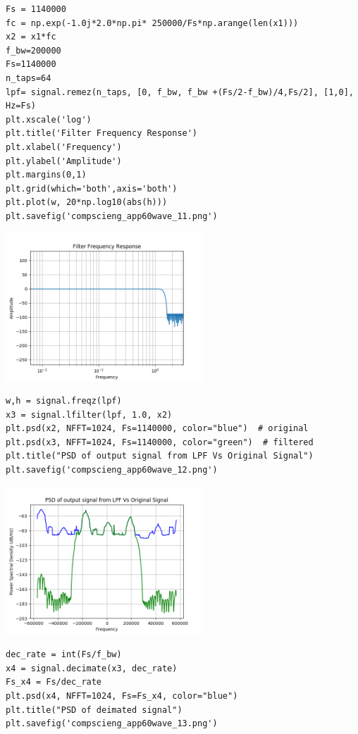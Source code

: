 \documentclass[12pt,fleqn]{article}\usepackage{../../common}
\begin{document}
\begin{verbatim}
Fs = 1140000
fc = np.exp(-1.0j*2.0*np.pi* 250000/Fs*np.arange(len(x1)))
x2 = x1*fc
f_bw=200000
Fs=1140000
n_taps=64
lpf= signal.remez(n_taps, [0, f_bw, f_bw +(Fs/2-f_bw)/4,Fs/2], [1,0], Hz=Fs)
plt.xscale('log')
plt.title('Filter Frequency Response')
plt.xlabel('Frequency')
plt.ylabel('Amplitude')
plt.margins(0,1)
plt.grid(which='both',axis='both')
plt.plot(w, 20*np.log10(abs(h)))
plt.savefig('compscieng_app60wave_11.png')
\end{verbatim}

\includegraphics[width=20em]{compscieng_app60wave_11.png}


\begin{verbatim}
w,h = signal.freqz(lpf)
x3 = signal.lfilter(lpf, 1.0, x2)
plt.psd(x2, NFFT=1024, Fs=1140000, color="blue")  # original
plt.psd(x3, NFFT=1024, Fs=1140000, color="green")  # filtered
plt.title("PSD of output signal from LPF Vs Original Signal")
plt.savefig('compscieng_app60wave_12.png')
\end{verbatim}

\includegraphics[width=20em]{compscieng_app60wave_12.png}

\begin{verbatim}
dec_rate = int(Fs/f_bw)
x4 = signal.decimate(x3, dec_rate)
Fs_x4 = Fs/dec_rate
plt.psd(x4, NFFT=1024, Fs=Fs_x4, color="blue")
plt.title("PSD of deimated signal")
plt.savefig('compscieng_app60wave_13.png')
\end{verbatim}
\end{document}
